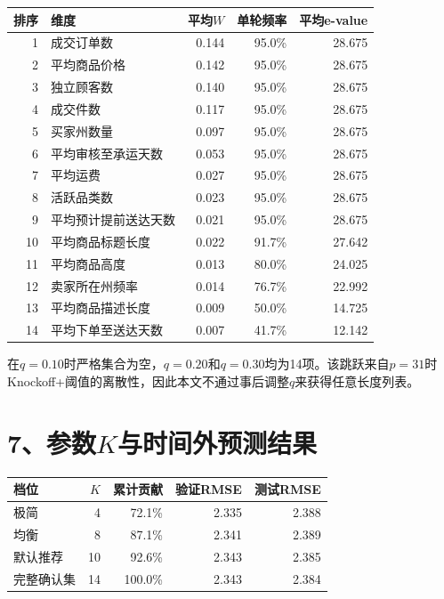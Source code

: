 \documentclass[UTF8,12pt,a4paper]{ctexart}
\begin{document}
\begin{center}
\scriptsize
\renewcommand{\arraystretch}{1.12}
\begin{tabular}{r l r r r}
\toprule
排序 & 维度 & 平均$W$ & 单轮频率 & 平均e-value\\
\midrule
1 & 成交订单数 & 0.144 & 95.0\% & 28.675\\
2 & 平均商品价格 & 0.142 & 95.0\% & 28.675\\
3 & 独立顾客数 & 0.140 & 95.0\% & 28.675\\
4 & 成交件数 & 0.117 & 95.0\% & 28.675\\
5 & 买家州数量 & 0.097 & 95.0\% & 28.675\\
6 & 平均审核至承运天数 & 0.053 & 95.0\% & 28.675\\
7 & 平均运费 & 0.027 & 95.0\% & 28.675\\
8 & 活跃品类数 & 0.023 & 95.0\% & 28.675\\
9 & 平均预计提前送达天数 & 0.021 & 95.0\% & 28.675\\
10 & 平均商品标题长度 & 0.022 & 91.7\% & 27.642\\
11 & 平均商品高度 & 0.013 & 80.0\% & 24.025\\
12 & 卖家所在州频率 & 0.014 & 76.7\% & 22.992\\
13 & 平均商品描述长度 & 0.009 & 50.0\% & 14.725\\
14 & 平均下单至送达天数 & 0.007 & 41.7\% & 12.142\\
\bottomrule
\end{tabular}
\end{center}

在$q=0.10$时严格集合为空，$q=0.20$和$q=0.30$均为14项。该跳跃来自$p=31$时Knockoff+阈值的离散性，因此本文不通过事后调整$q$来获得任意长度列表。

\newpage
\section*{7、参数$K$与时间外预测结果}

\begin{center}
\small
\begin{tabular}{lrrrr}
\toprule
档位 & $K$ & 累计贡献 & 验证RMSE & 测试RMSE\\
\midrule
极简 & 4 & 72.1\% & 2.335 & 2.388\\
均衡 & 8 & 87.1\% & 2.341 & 2.389\\
默认推荐 & 10 & 92.6\% & 2.343 & 2.385\\
完整确认集 & 14 & 100.0\% & 2.343 & 2.384\\
\bottomrule
\end{tabular}
\end{center}
\end{document}
